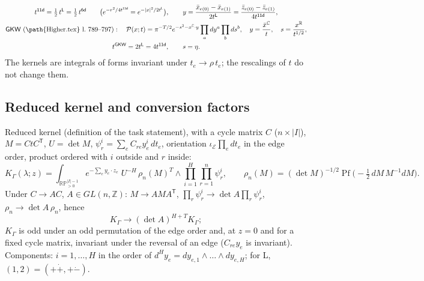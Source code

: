 \documentclass[10pt,a4paper]{article}
\numberwithin{equation}{section}
\newcommand{\bz}{\bar z}
\newcommand{\Pf}{\operatorname{Pf}}
\newcommand{\RPp}[1]{\mathbb{RP}^{#1}_{>0}}
\begin{document}
\begin{gather}
t^{\textsf{11d}}=\tfrac12\,t^{\textsf{L}}=\tfrac12\,t^{\textsf{6d}}\qquad\big(e^{-r^2/4t^{\textsf{11d}}}=e^{-|x|^2/2t^{\textsf{L}}}\big),\qquad
y=\frac{\bar x_{e(0)}-\bar x_{e(1)}}{2t^{\textsf{L}}}=\frac{\bz_{e(0)}-\bz_{e(1)}}{4t^{\textsf{11d}}},\\
\textsf{GKW}\ (\text{\path{Higher.tex} l.~789--797}):\quad\mathcal P(x;t)=\pi^{-T/2}e^{-s^2-x^{\mathbb C}\cdot y}\prod_ady^a\prod_bds^b,\quad y=\frac{\bar x^{\mathbb C}}t,\quad s=\frac{x^{\mathbb R}}{t^{1/2}},\\
t^{\textsf{GKW}}=2t^{\textsf{L}}=4t^{\textsf{11d}},\qquad s=\eta .
\end{gather}
The kernels are integrals of forms invariant under $t_e\to\rho\,t_e$; the rescalings of $t$ do not change them.

\subsection{Reduced kernel and conversion factors}

Reduced kernel (definition of the task statement), with a cycle matrix $C$ ($n\times|I|$), $M=CtC^{\mathsf T}$, $U=\det M$, $\psi^i_r=\sum_eC_{re}y^i_e\,dt_e$, orientation $\iota_{\mathcal E}\prod_edt_e$ in the edge order, product ordered with $i$ outside and $r$ inside:
\begin{equation}\label{eq-K-red}
K_\Gamma(\lambda;z)=\int_{\RPp{|I|-1}}e^{-\sum_ey_e\cdot z_e}\;U^{-H}\,\rho_n(M)^T\wedge\prod_{i=1}^H\prod_{r=1}^n\psi^i_r,\qquad\rho_n(M)=(\det M)^{-1/2}\Pf\big(-\tfrac12\,dM\,M^{-1}dM\big).
\end{equation}
Under $C\to AC$, $A\in GL(n,\mathbb Z)$: $M\to AMA^{\mathsf T}$, $\prod_r\psi^i_r\to\det A\prod_r\psi^i_r$, $\rho_n\to\det A\,\rho_n$, hence
\begin{equation}
K_\Gamma\to(\det A)^{H+T}K_\Gamma ;
\end{equation}
$K_\Gamma$ is odd under an odd permutation of the edge order and, at $z=0$ and for a fixed cycle matrix, invariant under the reversal of an edge ($C_{re}y_e$ is invariant). Components: $i=1,\dots,H$ in the order of $d^Hy_e=dy_{e,1}\wedge\dots\wedge dy_{e,H}$; for \textsf{L}, $(1,2)=(+\dot+,+\dot-)$.
\end{document}
